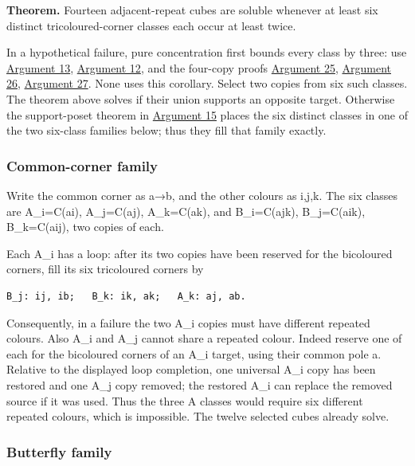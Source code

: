 \documentclass[
  10pt,
]{article}
\begin{document}
\textbf{Theorem.} Fourteen adjacent-repeat cubes are soluble whenever at
least six distinct tricoloured-corner classes each occur at least twice.

In a hypothetical failure, pure concentration first bounds every class
by three: use \protect\hyperlink{arg-13}{Argument 13},
\protect\hyperlink{arg-12}{Argument 12}, and the four-copy proofs
\protect\hyperlink{arg-25}{Argument 25},
\protect\hyperlink{arg-26}{Argument 26},
\protect\hyperlink{arg-27}{Argument 27}. None uses this corollary.
Select two copies from six such classes. The theorem above solves if
their union supports an opposite target. Otherwise the support-poset
theorem in \protect\hyperlink{arg-15}{Argument 15} places the six
distinct classes in one of the two six-class families below; thus they
fill that family exactly.

\hypertarget{common-corner-family}{%
\subsubsection*{Common-corner family}\label{common-corner-family}}

Write the common corner as a→b, and the other colours as i,j,k. The six
classes are A\_i=C(ai), A\_j=C(aj), A\_k=C(ak), and B\_i=C(ajk),
B\_j=C(aik), B\_k=C(aij), two copies of each.

Each A\_i has a loop: after its two copies have been reserved for the
bicoloured corners, fill its six tricoloured corners by

\begin{verbatim}
B_j: ij, ib;   B_k: ik, ak;   A_k: aj, ab.
\end{verbatim}

Consequently, in a failure the two A\_i copies must have different
repeated colours. Also A\_i and A\_j cannot share a repeated colour.
Indeed reserve one of each for the bicoloured corners of an A\_i target,
using their common pole a. Relative to the displayed loop completion,
one universal A\_i copy has been restored and one A\_j copy removed; the
restored A\_i can replace the removed source if it was used. Thus the
three A classes would require six different repeated colours, which is
impossible. The twelve selected cubes already solve.

\hypertarget{butterfly-family}{%
\subsubsection*{Butterfly family}\label{butterfly-family}}
\end{document}
